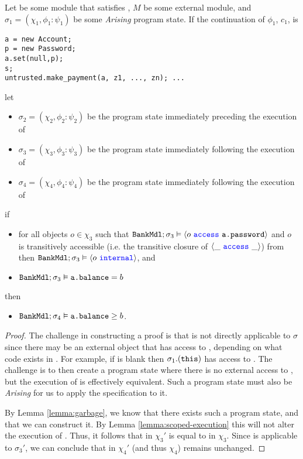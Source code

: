 \begin{theorem}
\label{thm:safety}
Let  be some module that satisfies \SrobustB, 
$M$ be some external module, and $\sigma_1 = (\chi_1, \phi_1 : \psi_1)$ be some \textit{Arising} program state. If the continuation of $\phi_1$, $c_1$, is
\begin{verbatim}
a = new Account; 
p = new Password; 
a.set(null,p); 
s; 
untrusted.make_payment(a, z1, ..., zn); ...
\end{verbatim}
let 
\begin{itemize}
\item
$\sigma_2 = (\chi_2, \phi_2 : \psi_2)$ be the program state immediately preceding the execution of 
\item
$\sigma_3 = (\chi_3, \phi_3 : \psi_3)$ be the program state immediately following the execution of 
\item
$\sigma_4 = (\chi_4, \phi_4 : \psi_4)$ be the program state immediately following the execution of\\  
\end{itemize}
if 
\begin{itemize}
\item
for all objects $o \in \chi_3$ such that ${\texttt{BankMdl}}; \sigma_3 \vDash \langle o\ {\color{blue}\texttt{access}}\ {\texttt{a.password}} \rangle$ and $o$ is transitively accessible (i.e. the transitive closure of $\langle \_\ {\color{blue}\texttt{access}}\ \_ \rangle$) from 
then ${\texttt{BankMdl}}; \sigma_3 \vDash \langle o\ {\color{blue}\texttt{internal}}\rangle$, and
\item
${\texttt{BankMdl}}; \sigma_3 \vDash {\texttt{a.balance}} = b$
\end{itemize}
then 
\begin{itemize}
\item
${\texttt{BankMdl}};\sigma_4 \vDash {\texttt{a.balance}} \geq b$.
\end{itemize}
\end{theorem}
\begin{proof}
The challenge in constructing a proof is that \SrobustB is not directly applicable to $\sigma$ since there may be an external 
object that has access to , depending on what code exists in . For example, if  
is blank then $\sigma_1.({\texttt{this}})$ has access to . The challenge is to then create 
a program state where there is no external access to , but the execution of 
is effectively equivalent. Such a program state must also be \textit{Arising} for us to apply the \Nec specification 
\SrobustB to it.

By Lemma \ref{lemma:garbage}, we know that there exists such a program state, and that we can construct it. By Lemma \ref{lemma:scoped-execution} this will 
not alter the execution of .
Thus, it follows that  in $\chi_3'$ is equal to  in $\chi_3$.
Since \SrobustB is applicable to $\sigma_3'$, we can conclude that  in $\chi_4'$ (and thus $\chi_4$)
remains unchanged.
\end{proof}




